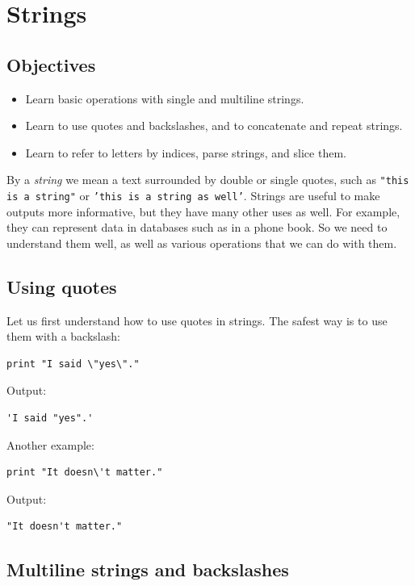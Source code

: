 
\section{Strings} \label{sec:strings}

\subsection{Objectives}

\begin{itemize}
\item Learn basic operations with single and multiline strings.
\item Learn to use quotes and backslashes, and to concatenate and repeat strings.
\item Learn to refer to letters by indices, parse strings, and slice them.
\end{itemize}
By a {\em string} we mean a text surrounded by double or single quotes, such as 
{\tt "this is a string"} or {\tt 'this is a string as well'}.
Strings are useful to make outputs more informative, but 
they have many other uses as well. For example, they can represent data 
in databases such as in a phone book. So we need to understand them well,
as well as various operations that we can do with them.

\subsection{Using quotes}

Let us first understand how to use quotes in strings. The safest way is to use 
them with a backslash:

\begin{verbatim}
print "I said \"yes\"."
\end{verbatim}
Output:

\begin{verbatim}
'I said "yes".'
\end{verbatim}
Another example:

\begin{verbatim}
print "It doesn\'t matter."
\end{verbatim}
Output:

\begin{verbatim}
"It doesn't matter."
\end{verbatim}

\subsection{Multiline strings and backslashes}

